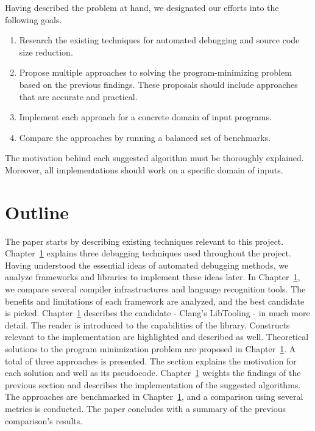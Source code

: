 Having described the problem at hand, we designated our efforts into 
the following goals.
\begin{enumerate}
  \item Research the existing techniques for automated debugging and source code 
  size reduction.
  \item Propose multiple approaches to solving the program-minimizing problem based 
  on the previous findings. 
  These proposals should include approaches that are accurate and practical.
  \item Implement each approach for a concrete domain of input programs.
  \item Compare the approaches by running a balanced set of benchmarks.
\end{enumerate}
The motivation behind each suggested algorithm must be thoroughly explained. 
Moreover, all implementations should work on a specific domain of inputs.

\section{Outline}

The paper starts by describing existing techniques relevant to this project. 
Chapter~\ref{} explains three debugging techniques used throughout 
the project. 
Having understood the essential ideas of automated debugging methods, we 
analyze frameworks and libraries to implement these ideas later. 
In Chapter~\ref{}, we compare several compiler infrastructures and 
language recognition tools. 
The benefits and limitations of each framework are analyzed, and the best 
candidate is picked. 
Chapter~\ref{} describes the candidate - Clang's LibTooling - in much 
more detail. 
The reader is introduced to the capabilities of the library. 
Constructs relevant to the implementation are highlighted and described as 
well. 
Theoretical solutions to the program minimization problem are proposed in 
Chapter~\ref{}.
A total of three approaches is presented. 
The section explains the motivation for each solution and well as its 
pseudocode. 
Chapter~\ref{} weights the findings of the previous section and describes 
the implementation of the suggested algorithms. 
The approaches are benchmarked in Chapter~\ref{}, and a comparison 
using several metrics is conducted. 
The paper concludes with a summary of the previous comparison's results.

